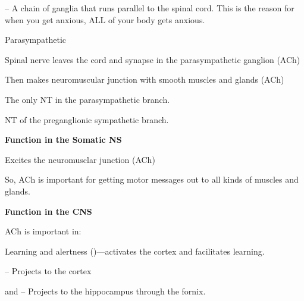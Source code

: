 \begin{coloredlist}
\begin{coloredlist}
\begin{coloredlist}
\begin{coloredlist}
\begin{coloredlist}
                \end{coloredlist}
                \item {} -- A chain of ganglia that runs parallel to the spinal cord. This is the reason for when you get anxious, ALL of your body gets anxious.
            \end{coloredlist}
            \item Parasympathetic
            \begin{coloredlist}
                \item Spinal nerve leaves the cord and synapse in the parasympathetic ganglion (ACh)
                \item Then makes neuromuscular junction with smooth muscles and glands (ACh)
            \end{coloredlist}
            \item The only NT in the parasympathetic branch.
            \item NT of the preganglionic sympathetic branch.
        \end{coloredlist}
        \item \textbf{Function in the Somatic NS}
        \begin{coloredlist}
            \item Excites the neuromusclar junction (ACh)
            \item So, ACh is important for getting motor messages out to all kinds of muscles and glands.
        \end{coloredlist}
        \item \textbf{Function in the CNS}
        \begin{coloredlist}
            \item ACh is important in:
            \begin{coloredlist}
                \item Learning and alertness ()---activates the cortex and facilitates learning.
                \begin{coloredlist}
                    \item {} -- Projects to the cortex
                    \item {} and  -- Projects to the hippocampus through the fornix.

\end{coloredlist}
\end{coloredlist}
\end{coloredlist}
\end{coloredlist}
\end{coloredlist}
